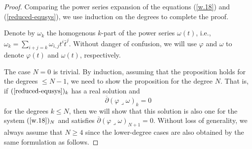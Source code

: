 \documentclass[12pt]{amsart}
\numberwithin{equation}{section}
\renewcommand{\1}{\mathds{1}}
\newcommand{\db}{\overline{\partial}}
\newcommand{\lc}{\lrcorner}
\renewcommand{\>}{\rightarrow}
\def\b{\bar}
\begin{document}
\begin{proof}
Comparing the power series expansion of the equations (\ref{w.18})
and (\ref{reduced-equsys}), we use induction on the degrees to
complete the proof.

Denote by $\omega_k$ the homogenous $k$-part of the power series
$\omega(t)$, i.e., $\omega_k=\sum_{i+j=k}\omega_{i,j}t^i\b{t}^j$.
Without danger of confusion, we will use $\varphi$ and $\omega$ to
denote $\varphi(t)$ and $\omega(t)$, respectively.

The case $N=0$ is trivial.
By induction, assuming that the proposition holds for the degrees
$\leq N-1$, we need to show the proposition for the degree $N$. That
is, if $(\ref{reduced-equsys})_k$ has a real solution and
$$\db(\varphi\lc \omega)_{k}=0$$
for the degrees $k\leq N$, then we will show that this solution is
also one for the system $(\ref{w.18})_N$ and  satisfies
$\db(\varphi\lc \omega)_{N+1}=0$. Without loss of generality, we
always assume that $N\geq 4$ since the lower-degree cases are also
obtained by the same formulation as follows.


\end{proof}
\end{document}
